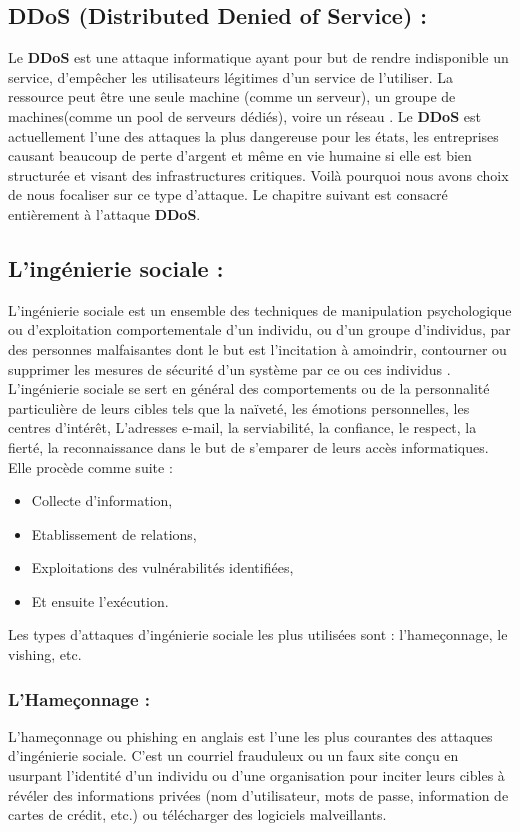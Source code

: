 \subsection{DDoS (Distributed Denied of Service) : }
Le \textbf{DDoS} est une attaque informatique ayant pour but de rendre indisponible un service, d'empêcher les utilisateurs légitimes d'un service de l'utiliser. La ressource peut être une seule machine (comme un serveur), un groupe de machines(comme un pool de serveurs dédiés), voire un réseau \cite{refados}. Le \textbf{DDoS} est actuellement l’une des attaques la plus dangereuse pour les états, les entreprises causant beaucoup de perte d’argent et même en vie humaine si elle est bien structurée et visant des infrastructures critiques. Voilà pourquoi nous avons choix de nous focaliser sur ce type d’attaque. Le chapitre suivant est consacré entièrement à l’attaque \textbf{DDoS}.
\subsection{L'ingénierie sociale : }
L’ingénierie sociale est un ensemble des techniques de manipulation psychologique ou d’exploitation comportementale d’un individu, ou d’un groupe d’individus, par des personnes malfaisantes dont le but est l’incitation à amoindrir, contourner ou supprimer les mesures de sécurité d’un système par ce ou ces individus \cite{ref13}.\\

L’ingénierie sociale se sert en général des comportements ou de la personnalité particulière de leurs cibles tels que la naïveté, les émotions personnelles, les centres d’intérêt, L’adresses e-mail, la serviabilité, la confiance, le respect, la fierté, la reconnaissance dans le but de s’emparer de leurs accès informatiques. Elle procède comme suite : 
\begin{itemize}
	\item Collecte d’information,
	\item Etablissement de relations,
	\item Exploitations des vulnérabilités identifiées,
	\item Et ensuite l’exécution.
\end{itemize}
Les types d’attaques d’ingénierie sociale les plus utilisées sont : l’hameçonnage, le vishing, etc.
\subsubsection{L’Hameçonnage : }
L’hameçonnage ou phishing en anglais est l’une les plus courantes des attaques d’ingénierie sociale. C’est un courriel frauduleux ou un faux site conçu en usurpant l’identité d’un individu ou d’une organisation pour inciter leurs cibles à révéler des informations privées (nom d’utilisateur, mots de passe, information de cartes de crédit, etc.) ou télécharger des logiciels malveillants.\\

